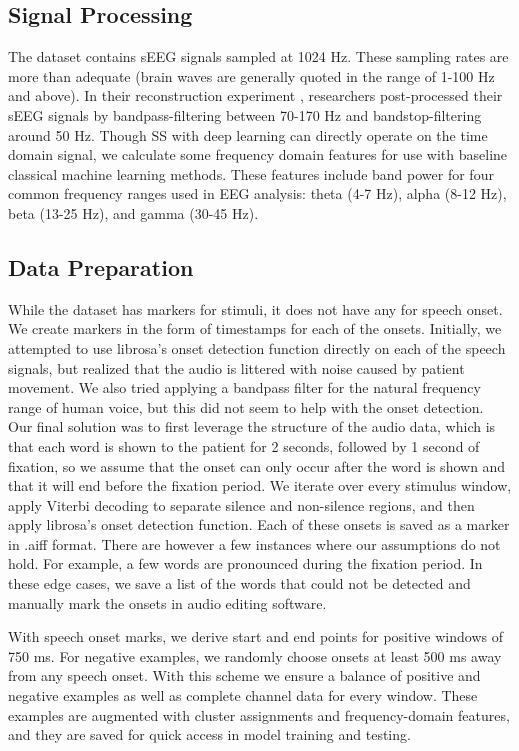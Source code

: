 \documentclass[format=sigconf, nonacm=true, review=false, screen=true]{acmart}
\begin{document}
\subsection{Signal Processing}

The dataset contains sEEG signals sampled at 1024 Hz. These sampling rates are more than adequate (brain waves are generally quoted in the range of 1-100 Hz and above). In their reconstruction experiment \cite{verwoert2022dataset}, researchers post-processed their sEEG signals by bandpass-filtering between 70-170 Hz and bandstop-filtering around 50 Hz. Though SS with deep learning \cite{sakthi2021keyword} can directly operate on the time domain signal, we calculate some frequency domain features for use with baseline classical machine learning methods. These features include band power for four common frequency ranges used in EEG analysis: theta (4-7 Hz), alpha (8-12 Hz), beta (13-25 Hz), and gamma (30-45 Hz).

\subsection{Data Preparation}

While the dataset has markers for stimuli, it does not have any for speech onset. We create markers in the form of timestamps for each of the onsets. Initially, we attempted to use librosa's onset detection function directly on each of the speech signals, but realized that the audio is littered with noise caused by patient movement. We also tried applying a bandpass filter for the natural frequency range of human voice, but this did not seem to help with the onset detection. Our final solution was to first leverage the structure of the audio data, which is that each word is shown to the patient for 2 seconds, followed by 1 second of fixation, so we assume that the onset can only occur after the word is shown and that it will end before the fixation period. We iterate over every stimulus window, apply Viterbi decoding to separate silence and non-silence regions, and then apply librosa's onset detection function. Each of these onsets is saved as a marker in .aiff format. There are however a few instances where our assumptions do not hold. For example, a few words are pronounced during the fixation period. In these edge cases, we save a list of the words that could not be detected and manually mark the onsets in audio editing software.

With speech onset marks, we derive start and end points for positive windows of 750 ms. For negative examples, we randomly choose onsets at least 500 ms away from any speech onset. With this scheme we ensure a balance of positive and negative examples as well as complete channel data for every window. These examples are augmented with cluster assignments and frequency-domain features, and they are saved for quick access in model training and testing.
\end{document}
